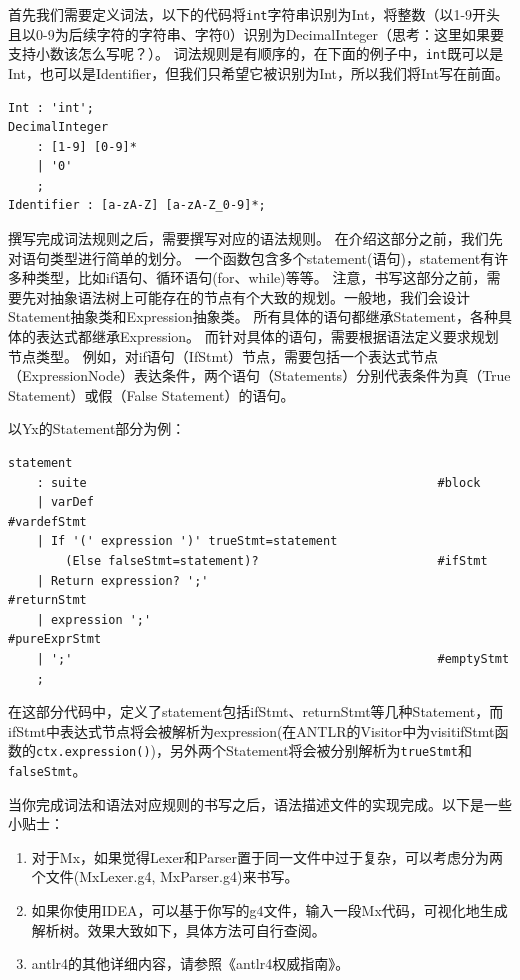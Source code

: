 首先我们需要定义词法，以下的代码将\texttt{int}字符串识别为Int，将整数（以1-9开头且以0-9为后续字符的字符串、字符0）识别为DecimalInteger（思考：这里如果要支持小数该怎么写呢？）。
词法规则是有顺序的，在下面的例子中，\texttt{int}既可以是Int，也可以是Identifier，但我们只希望它被识别为Int，所以我们将Int写在前面。
\begin{lstlisting}
Int : 'int';
DecimalInteger
    : [1-9] [0-9]*
    | '0'
    ;
Identifier : [a-zA-Z] [a-zA-Z_0-9]*;
\end{lstlisting}



撰写完成词法规则之后，需要撰写对应的语法规则。
在介绍这部分之前，我们先对语句类型进行简单的划分。
一个函数包含多个statement(语句)，statement有许多种类型，比如if语句、循环语句(for、while)等等。
注意，书写这部分之前，需要先对抽象语法树上可能存在的节点有个大致的规划。一般地，我们会设计Statement抽象类和Expression抽象类。
所有具体的语句都继承Statement，各种具体的表达式都继承Expression。
而针对具体的语句，需要根据语法定义要求规划节点类型。
例如，对if语句（IfStmt）节点，需要包括一个表达式节点（ExpressionNode）表达条件，两个语句（Statements）分别代表条件为真（True Statement）或假（False Statement）的语句。

以Yx的Statement部分为例：
\begin{lstlisting}
statement
    : suite                                                 #block
    | varDef                                                #vardefStmt
    | If '(' expression ')' trueStmt=statement 
        (Else falseStmt=statement)?                         #ifStmt
    | Return expression? ';'                                #returnStmt
    | expression ';'                                        #pureExprStmt
    | ';'                                                   #emptyStmt
    ;
\end{lstlisting}
在这部分代码中，定义了statement包括ifStmt、returnStmt等几种Statement，而ifStmt中表达式节点将会被解析为expression(在ANTLR的Visitor中为visitifStmt函数的\texttt{ctx.expression()})，另外两个Statement将会被分别解析为\texttt{trueStmt}和\texttt{falseStmt}。


当你完成词法和语法对应规则的书写之后，语法描述文件的实现完成。以下是一些小贴士：
\begin{enumerate}
    \item 对于Mx，如果觉得Lexer和Parser置于同一文件中过于复杂，可以考虑分为两个文件(MxLexer.g4, MxParser.g4)来书写。
    \item 如果你使用IDEA，可以基于你写的g4文件，输入一段Mx代码，可视化地生成解析树。效果大致如下，具体方法可自行查阅。
    \item antlr4的其他详细内容，请参照《antlr4权威指南》。
\end{enumerate}

